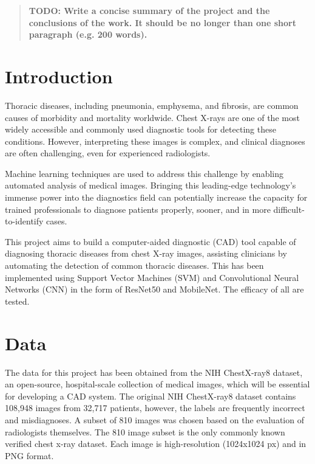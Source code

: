 \documentclass{article}
\theoremstyle{plain}
\theoremstyle{definition}
\theoremstyle{remark}
\begin{document}

\begin{abstract}
    \textbf{TODO: Write a concise summary of the project and the conclusions of the work. It should be no longer
    than one short paragraph (e.g. 200 words).}
\end{abstract}

\section{Introduction}
Thoracic diseases, including pneumonia, emphysema, and fibrosis, are common causes of morbidity and
mortality worldwide. Chest X-rays are one of the most widely accessible and commonly used diagnostic
tools for detecting these conditions. However, interpreting these images is complex, and clinical
diagnoses are often challenging, even for experienced radiologists.

Machine learning techniques are used to address this challenge by enabling automated analysis of
medical images. Bringing this leading-edge technology's immense power into the diagnostics field can
potentially increase the capacity for trained professionals to diagnose patients properly, sooner,
and in more difficult-to-identify cases.

This project aims to build a computer-aided diagnostic (CAD) tool capable of diagnosing thoracic
diseases from chest X-ray images, assisting clinicians by automating the detection of common thoracic
diseases. This has been implemented using Support Vector Machines (SVM) and Convolutional Neural Networks
(CNN) in the form of ResNet50 and MobileNet. The efficacy of all are tested.

\section{Data}
The data for this project has been obtained from the NIH ChestX-ray8 dataset, an open-source,
hospital-scale collection of medical images, which will be essential for developing a CAD system.
The original NIH ChestX-ray8 dataset contains 108,948 images from 32,717 patients, however, the
labels are frequently incorrect and misdiagnoses.
A subset of 810 images was chosen based on the evaluation of radiologists themselves. The 810 image
subset is the only commonly known verified chest x-ray dataset. Each image is high-resolution
(1024x1024 px) and in PNG format.
\end{document}
